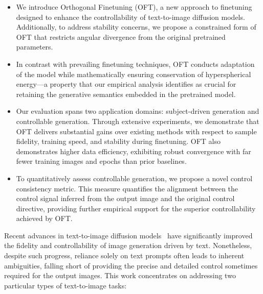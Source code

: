 \begin{itemize}[leftmargin=*,nosep]
\begin{itemize}[leftmargin=*,nosep]
    \item We introduce Orthogonal Finetuning (OFT), a new approach to finetuning designed to enhance the controllability of text-to-image diffusion models. Additionally, to address stability concerns, we propose a constrained form of OFT that restricts angular divergence from the original pretrained parameters.
    \item In contrast with prevailing finetuning techniques, OFT conducts adaptation of the model while mathematically ensuring conservation of hyperspherical energy—a property that our empirical analysis identifies as crucial for retaining the generative semantics embedded in the pretrained model.
    \item Our evaluation spans two application domains: subject-driven generation and controllable generation. Through extensive experiments, we demonstrate that OFT delivers substantial gains over existing methods with respect to sample fidelity, training speed, and stability during finetuning. OFT also demonstrates higher data efficiency, exhibiting robust convergence with far fewer training images and epochs than prior baselines.
    \item To quantitatively assess controllable generation, we propose a novel control consistency metric. This measure quantifies the alignment between the control signal inferred from the output image and the original control directive, providing further empirical support for the superior controllability achieved by OFT.
\end{itemize}

Recent advances in text-to-image diffusion models~\cite{saharia2022photorealistic,ramesh2022hierarchical,rombach2022high} have significantly improved the fidelity and controllability of image generation driven by text. Nonetheless, despite such progress, reliance solely on text prompts often leads to inherent ambiguities, falling short of providing the precise and detailed control sometimes required for the output images. This work concentrates on addressing two particular types of text-to-image tasks:


\end{itemize}
